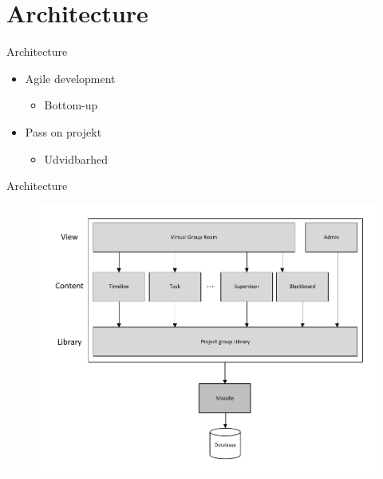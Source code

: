 \section{Architecture}
\begin{frame}{Architecture}
\begin{itemize}
	\item Agile development
	\begin{itemize}
		\item Bottom-up  
	\end{itemize}
	\item Pass on projekt
	\begin{itemize}
		\item Udvidbarhed
	\end{itemize}
	
\end{itemize}
\end{frame}


\begin{frame}{Architecture}
\begin{figure}%
\includegraphics[width=\columnwidth]{input/Assets/architecture}%
\end{figure}	
\end{frame}